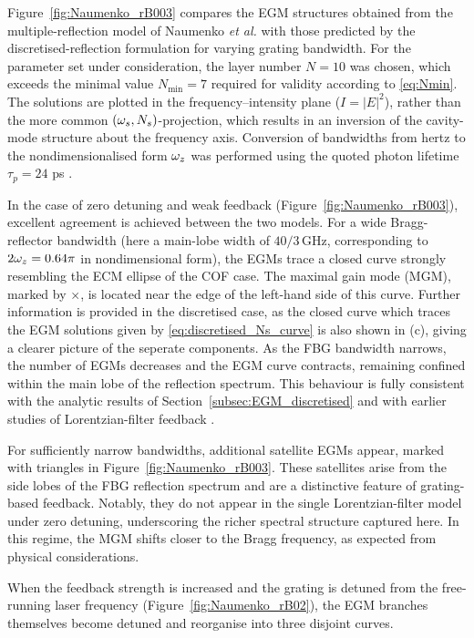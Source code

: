 %
\par
%
Figure~\ref{fig:Naumenko_rB003} compares the EGM structures obtained from the multiple-reflection model of Naumenko \textit{et al.} \cite{naumenko2003characteristics} with those predicted by the discretised-reflection formulation for varying grating bandwidth. 
For the parameter set under consideration, the layer number $N=10$ was chosen, which exceeds the minimal value $N_\text{min}=7$ required for validity according to \eqref{eq:Nmin}. 
The solutions are plotted in the frequency–intensity plane ($I=|E|^2$), rather than the more common $(\omega_s,N_s)$-projection, which results in an inversion of the cavity-mode structure about the frequency axis. 
Conversion of bandwidths from hertz to the nondimensionalised form $\omega_z$ was performed using the quoted photon lifetime $\tau_p=24$ ps \cite{naumenko2003characteristics}. 
%
\par
%
In the case of zero detuning and weak feedback (Figure~\ref{fig:Naumenko_rB003}), excellent agreement is achieved between the two models. 
For a wide Bragg-reflector bandwidth (here a main-lobe width of $40/3\,$GHz, corresponding to $2\omega_z=0.64\pi$ in nondimensional form), the EGMs trace a closed curve strongly resembling the ECM ellipse of the COF case. 
The maximal gain mode (MGM), marked by $\times$, is located near the edge of the left-hand side of this curve. 
Further information is provided in the discretised case, as the closed curve which traces the EGM solutions given by \eqref{eq:discretised_Ns_curve} is also shown in (c), giving a clearer picture of the seperate components.
As the FBG bandwidth narrows, the number of EGMs decreases and the EGM curve contracts, remaining confined within the main lobe of the reflection spectrum. 
This behaviour is fully consistent with the analytic results of Section~\ref{subsec:EGM_discretised} and with earlier studies of Lorentzian-filter feedback \cite{yousefi1999dynamical}. 
%
\par
%
For sufficiently narrow bandwidths, additional satellite EGMs appear, marked with triangles in Figure~\ref{fig:Naumenko_rB003}. 
These satellites arise from the side lobes of the FBG reflection spectrum and are a distinctive feature of grating-based feedback. 
Notably, they do not appear in the single Lorentzian-filter model under zero detuning, underscoring the richer spectral structure captured here. 
In this regime, the MGM shifts closer to the Bragg frequency, as expected from physical considerations. 
%
\par
%
When the feedback strength is increased and the grating is detuned from the free-running laser frequency (Figure~\ref{fig:Naumenko_rB02}), the EGM branches themselves become detuned and reorganise into three disjoint curves. 
